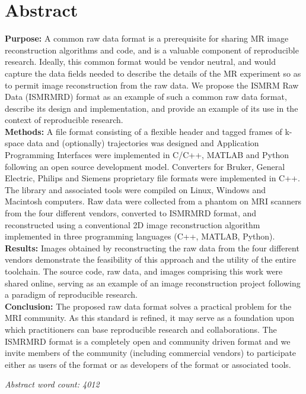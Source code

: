 \documentclass[12pt]{article}
\begin{document}
\section*{Abstract}
\textbf{Purpose:} A common raw data format is a prerequisite for sharing MR image reconstruction algorithms and code, and is a valuable component of reproducible research.  Ideally, this common format would be vendor neutral, and would capture the data fields needed to describe the details of the MR experiment so as to permit image reconstruction from the raw data.  We propose the ISMRM Raw Data (ISMRMRD) format as an example of such a common raw data format, describe its design and implementation, and provide an example of its use in the context of reproducible research.\\
\textbf{Methods:} A file format consisting of a flexible header and tagged frames of k-space data and (optionally) trajectories was designed and  Application Programming Interfaces were implemented in C/C++, MATLAB and Python following an open source development model.  Converters for Bruker, General Electric, Philips and Siemens proprietary file formats were implemented in C++. The library and associated tools were compiled on Linux, Windows and Macintosh computers. Raw data were collected from a phantom on MRI scanners from the four different vendors, converted to ISMRMRD format, and reconstructed using a conventional 2D image reconstruction algorithm implemented in three programming languages (C++, MATLAB, Python).\\
\textbf{Results:} Images obtained by reconstructing the raw data from the four different vendors demonstrate the feasibility of this approach and the utility of the entire toolchain.  The source code, raw data, and images comprising this work were shared online, serving as an example of an image reconstruction project following a paradigm of reproducible research.\\
\textbf{Conclusion:} The proposed raw data format solves a practical problem
for the MRI community.  As this standard is refined, it may serve as a foundation upon which practitioners can base reproducible research and collaborations.  The ISMRMRD format is a completely open and community driven format and we invite members of the community (including commercial vendors) to participate either as users of the format or as developers of the format or associated tools.

\textit{Abstract word count: 4012} %
\end{document}
